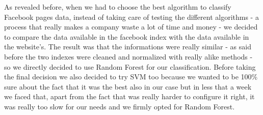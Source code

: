 As revealed before, when we had to choose the best algorithm to classify Facebook pages data, instead of taking care of testing the different algorithms - a process that really makes a company waste a lot of time and money -  we decided to compare the data available in the facebook index with the data available in the website's. The result was that the informations were really similar - as said before the two indexes were cleaned and normalized with really alike methods - so we directly decided to use Random Forest for our classification. Before taking the final decision we also decided to try SVM too because we wanted to be 100\% sure about the fact that it was the best also in our case but in less that a week we faced that, apart from the fact that was really harder to configure it right, it was really too slow for our needs and we firmly opted for Random Forest.



